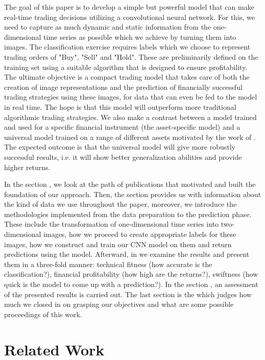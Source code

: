 \documentclass[12pt, a4paper]{article}
\begin{document}
The goal of this paper is to develop a simple but powerful model that can make real-time trading decisions utilizing a convolutional neural network. For this, we need to capture as much dynamic 
and static information from the one-dimensional time series as possible which we achieve by turning them into images. The classification exercise requires labels which we choose to represent trading orders of "Buy", "Sell" and "Hold". 
These are preliminarily defined on the training set using a suitable algorithm that is designed to ensure profitability. The ultimate objective is a compact trading model that takes care of both the creation of image representations and the prediction of financially successful trading strategies using these images, for data that can even be fed to the model in real time. 
The hope is that this model will outperform more traditional algorithmic trading strategies. We also make a contrast between a model trained and used for a specific financial instrument (the asset-specific model) and a universal model trained on a range of different assets motivated by the work of \cite{sirignano2018universal}. The expected outcome is that the universal model will give more robustly successful results, i.e. it will show better generalization abilities and provide higher returns. 

In the section , we look at the path of publications that motivated and built the foundation of our approach. Then, the section  provides us with information about the kind of data we use throughout 
the paper, moreover, we introduce the methodologies implemented from the data preparation to the prediction phase. These include the transformation of one-dimensional time series into two-dimensional images, 
how we proceed to create appropriate labels for these images, how we construct and train our CNN model on them and return predictions using the model. 
Afterward, in  we examine the results and present them in a three-fold manner:
technical fitness (how accurate is the classification?), financial profitability (how high are the returns?), swiftness (how quick is the model to come up with a prediction?). In the section , an assessment of the presented results is carried out.
The last section is the  which judges how much 
we closed in on grasping our objectives and what are some possible proceedings of this work.

\section{Related Work}
\label{sec:RelWork}
\end{document}
